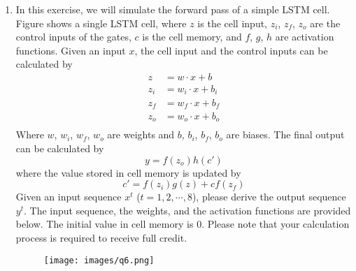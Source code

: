 \documentclass[12pt, a4paper]{article}
\begin{document}
\begin{enumerate}
\item In this exercise, we will simulate the forward pass of a simple LSTM cell. Figure shows a single LSTM cell, where $z$ is the cell input, $z_i$, $z_f$, $z_o$ are the control inputs of the gates, $c$ is the cell memory, and $f$, $g$, $h$ are activation functions. Given an input $x$, the cell input and the control inputs can be calculated by
\begin{align*}
    z &= w\cdot x+b\\
    z_i &= w_i\cdot x+b_i\\
    z_f &= w_f\cdot x+b_f\\
    z_o &= w_o\cdot x+b_o\\
\end{align*}
Where $w$, $w_i$, $w_f$, $w_o$ are weights and $b$, $b_i$, $b_f$, $b_o$ are biases. The final output can be calculated by
$$y = f(z_o)h(c')$$
where the value stored in cell memory is updated by
$$c′ = f(z_i)g(z) + cf(z_f)$$
Given an input sequence $x^t$ ($t = 1, 2, \cdots, 8$), please derive the output sequence $y^t$. The input sequence, the weights, and the activation functions are provided below. The initial value in cell memory is $0$. Please note that your calculation process is required to receive full credit.
\begin{figure}[h]
    \centering
    \texttt{[image: images/q6.png]}
\end{figure}
\end{enumerate}
\end{document}
